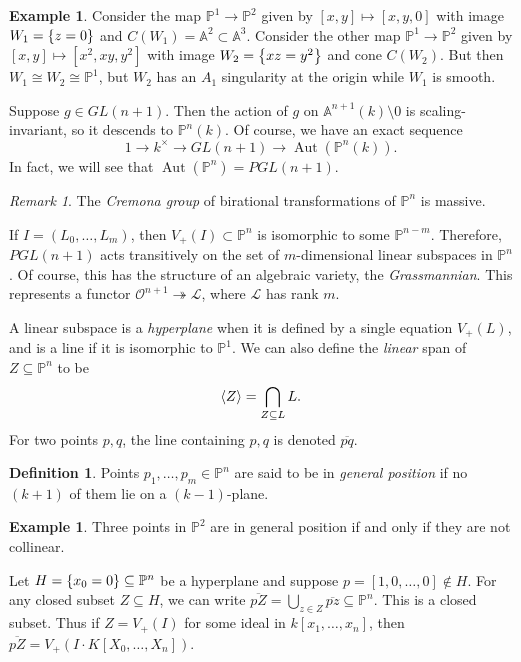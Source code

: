 \documentclass[leqno, openany]{memoir}
\theoremstyle{definition}
\newtheorem{defn}[thm]{Definition}
\newtheorem{exm}[thm]{Example}
\theoremstyle{remark}
\newtheorem{rmk}[thm]{Remark}
\theoremstyle{plain}
\theoremstyle{definition}
\theoremstyle{remark}
\newcommand{\A}{\mathbb{A}}
\renewcommand{\P}{\mathbb{P}}
\newcommand{\mc}[1]{\mathcal{#1}}
\newcommand{\ol}[1]{\overline{#1}}
\DeclareMathOperator{\Aut}{Aut}
\begin{document}
\begin{exm}
    Consider the map $\P^1 \to \P^2$ given by $[x,y] \mapsto [x,y,0]$ with image $W_1 = \qty{z = 0}$ and $C(W_1) = \A^2 \subset \A^3$. Consider the other map $\P^1 \to \P^2$ given by $[x,y] \mapsto [x^2, xy, y^2]$ with image $W_2 = \qty{xz = y^2}$ and cone $C(W_2)$. But then $W_1 \cong W_2 \cong \P^1$, but $W_2$ has an $A_1$ singularity at the origin while $W_1$ is smooth.
\end{exm}

Suppose $g \in GL(n+1)$. Then the action of $g$ on $\A^{n+1}(k) \setminus \qty{0}$ is scaling-invariant, so it descends to $\P^n(k)$. Of course, we have an exact sequence
\[ 1 \to k^{\times} \to GL(n+1) \to \Aut(\P^n(k)). \]
In fact, we will see that $\Aut(\P^n) = PGL(n+1)$.

\begin{rmk}
    The \textit{Cremona group} of birational transformations of $\P^n$ is massive.
\end{rmk}

If $I = (L_0, \ldots, L_m)$, then $V_+(I) \subset \P^n$ is isomorphic to some $\P^{n-m}$. Therefore, $PGL(n+1)$ acts transitively on the set of $m$-dimensional linear subspaces in $\P^n$. Of course, this has the structure of an algebraic variety, the \textit{Grassmannian}. This represents a functor $\mc{O}^{n+1} \twoheadrightarrow \mc{L}$, where $\mc{L}$ has rank $m$. 

A linear subspace is a \textit{hyperplane} when it is defined by a single equation $V_+(L)$, and is a line if it is isomorphic to $\P^1$. We can also define the \textit{linear} span of $Z \subseteq \P^n$ to be
\[ \ev{Z} = \bigcap_{Z \subseteq L} L. \]
For two points $p,q$, the line containing $p,q$ is denoted $\ol{pq}$.

\begin{defn}
    Points $p_1, \ldots, p_m \in \P^n$ are said to be in \textit{general position} if no $(k+1)$ of them lie on a $(k-1)$-plane.
\end{defn}

\begin{exm}
    Three points in $\P^2$ are in general position if and only if they are not collinear.
\end{exm}

Let $H = \qty{x_0 = 0} \subseteq \P^n$ be a hyperplane and suppose $p = [1,0,\ldots,0] \notin H$. For any closed subset $Z \subseteq H$, we can write $\ol{pZ} = \bigcup_{z \in Z} \ol{pz} \subseteq \P^n$. This is a closed subset. Thus if $Z = V_+(I)$ for some ideal in $k[x_1, \ldots, x_n]$, then $\ol{pZ} = V_+(I \cdot K[X_0, \ldots, X_n])$.
\end{document}
